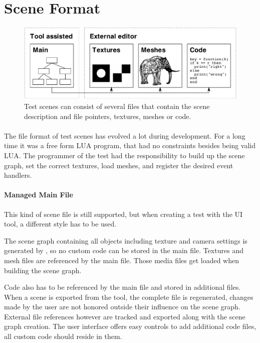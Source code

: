 \section{Scene Format}

\begin{figure}[htb]
\begin{center}
\includegraphics[width=15.5cm]{media/document.pdf}
\caption{Test scenes can consist of several files that contain the scene description and file pointers, textures, meshes or code.\label{imgDocument}}
\end{center}
\end{figure}

\paragraph{}
The file format of test scenes has evolved a lot during development.
For a long time it was a free form LUA program, that had no constraints besides being valid LUA.
The programmer of the test had the responsibility to build up the scene graph, set the correct textures, load meshes, and register the desired event handlers.

\paragraph{Managed Main File}
This kind of scene file is still supported, but when creating a test with the UI tool, a different style has to be used.

The scene graph containing all objects including texture and camera settings is generated by \ER, so no custom code can be stored in the main file.
Textures and mesh files are referenced by the main file.
Those media files get loaded when building the scene graph.

Code also has to be referenced by the main file and stored in additional files.
When a scene is exported from the tool, the complete file is regenerated, changes made by the user are not honored outside their influence on the scene graph.
External file references however are tracked and exported along with the scene graph creation.
The user interface offers easy controls to add additional code files, all custom code should reside in them.


